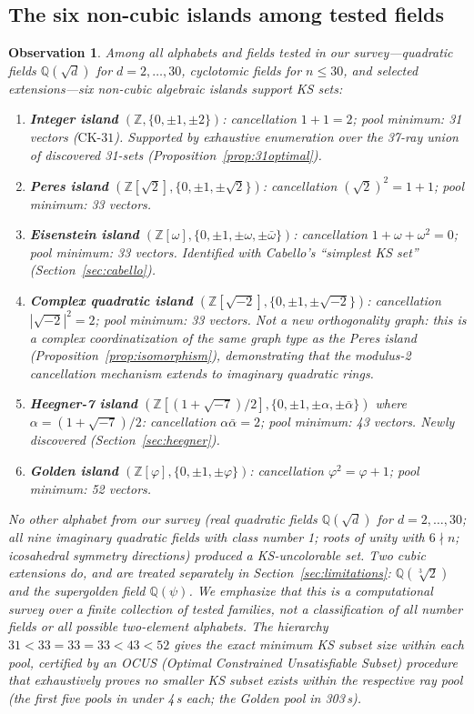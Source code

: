 \documentclass[12pt,a4paper]{article}
\newtheorem{observation}[theorem]{Observation}
\newcommand{\Z}{\mathbb{Z}}
\newcommand{\Q}{\mathbb{Q}}
\newcommand{\CK}{\mathrm{CK}\text{-}31}
\begin{document}
\subsection{The six non-cubic islands among tested fields}\label{sec:sixislands}

\begin{observation}\label{obs:islands}
Among all alphabets and fields tested in our survey---quadratic fields $\Q(\sqrt{d})$ for $d = 2, \ldots, 30$, cyclotomic fields for $n \leq 30$, and selected extensions---six non-cubic algebraic islands support KS sets:
\begin{enumerate}[label=(\arabic*)]
    \item \textbf{Integer island} $(\Z, \{0,\pm 1,\pm 2\})$: cancellation $1 + 1 = 2$; pool minimum: 31 vectors ($\CK$). Supported by exhaustive enumeration over the 37-ray union of discovered 31-sets (Proposition~\ref{prop:31optimal}).
    \item \textbf{Peres island} $(\Z[\sqrt{2}], \{0,\pm 1,\pm\sqrt{2}\})$: cancellation $(\sqrt{2})^2 = 1 + 1$; pool minimum: 33 vectors.
    \item \textbf{Eisenstein island} $(\Z[\omega], \{0,\pm 1,\pm\omega,\pm\bar\omega\})$: cancellation $1 + \omega + \omega^2 = 0$; pool minimum: 33 vectors. Identified with Cabello's ``simplest KS set''~\cite{Cabello2025simplest} (Section~\ref{sec:cabello}).
    \item \textbf{Complex quadratic island} $(\Z[\sqrt{-2}], \{0,\pm 1,\pm\sqrt{-2}\})$: cancellation $|\sqrt{-2}|^2 = 2$; pool minimum: 33 vectors. Not a new orthogonality graph: this is a complex coordinatization of the same graph type as the Peres island (Proposition~\ref{prop:isomorphism}), demonstrating that the modulus-2 cancellation mechanism extends to imaginary quadratic rings.
    \item \textbf{Heegner-7 island} $(\Z[(1+\sqrt{-7})/2], \{0,\pm 1,\pm\alpha,\pm\bar\alpha\})$ where $\alpha = (1+\sqrt{-7})/2$: cancellation $\alpha\bar\alpha = 2$; pool minimum: 43 vectors. Newly discovered (Section~\ref{sec:heegner}).
    \item \textbf{Golden island} $(\Z[\varphi], \{0,\pm 1,\pm\varphi\})$: cancellation $\varphi^2 = \varphi + 1$; pool minimum: 52 vectors.
\end{enumerate}
No other alphabet from our survey (real quadratic fields $\Q(\sqrt{d})$ for $d = 2,\ldots,30$; all nine imaginary quadratic fields with class number 1; roots of unity with $6\nmid n$; icosahedral symmetry directions) produced a KS-uncolorable set.  Two cubic extensions do, and are treated separately in Section~\ref{sec:limitations}: $\Q(\sqrt[3]{2})$ and the supergolden field $\Q(\psi)$.  We emphasize that this is a computational survey over a finite collection of tested families, not a classification of all number fields or all possible two-element alphabets.  The hierarchy $31 < 33 = 33 = 33 < 43 < 52$ gives the exact minimum KS subset size \emph{within each pool}, certified by an OCUS (Optimal Constrained Unsatisfiable Subset) procedure that exhaustively proves no smaller KS subset exists within the respective ray pool (the first five pools in under 4\,s each; the Golden pool in 303\,s).
\end{observation}
\end{document}
